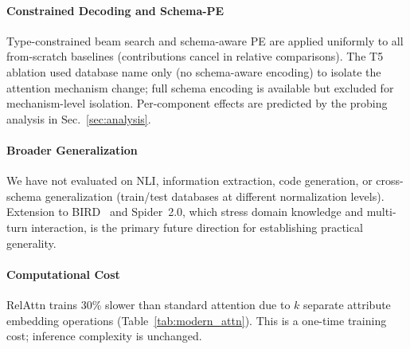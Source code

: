 \documentclass[conference]{IEEEtran}
\begin{document}
\paragraph{Constrained Decoding and Schema-PE}
Type-constrained beam search and schema-aware PE are applied uniformly to all from-scratch baselines (contributions cancel in relative comparisons). The T5 ablation used database name only (no schema-aware encoding) to isolate the attention mechanism change; full schema encoding is available but excluded for mechanism-level isolation. Per-component effects are predicted by the probing analysis in Sec.~\ref{sec:analysis}.

\paragraph{Broader Generalization}
We have not evaluated on NLI, information extraction, code generation, or cross-schema generalization (train/test databases at different normalization levels). Extension to BIRD~\cite{li2023bird} and Spider~2.0, which stress domain knowledge and multi-turn interaction, is the primary future direction for establishing practical generality.

\paragraph{Computational Cost}
RelAttn trains 30\% slower than standard attention due to $k$ separate attribute embedding operations (Table~\ref{tab:modern_attn}). This is a one-time training cost; inference complexity is unchanged.

\end{document}
